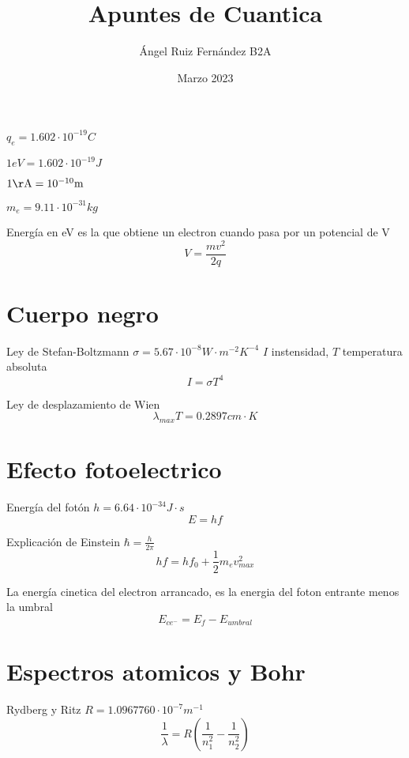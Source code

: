 \documentclass[12pt, letterpaper, twoside]{article}
\title{Apuntes de Cuantica}
\author{Ángel Ruiz Fernández B2A}
\date{Marzo 2023}
\begin{document}
	\maketitle
	
	$q_e = 1.602 \cdot 10^{-19} \si{C}$
	
	$1 \si{eV} = 1.602 \cdot 10^{-19} \si{J}$
	
	$1 \si{\AA} = 10^{-10} \si{m}$
	
	$m_e = 9.11 \cdot 10^{-31} \si{kg}$
	
	Energía en eV es la que obtiene un electron cuando pasa por un potencial de V
	\begin{equation}
		V = \frac{mv^2}{2q}
	\end{equation}
	
	\section{Cuerpo negro}
	
	Ley de Stefan-Boltzmann $\sigma = 5.67 \cdot 10^{-8} \si{W \cdot m^{-2} K^{-4}}$ $I$ instensidad, $T$ temperatura absoluta
	\begin{equation}
		I = \sigma T^4
	\end{equation}
	
	Ley de desplazamiento de Wien	
	\begin{equation}
		\lambda_{max} T = 0.2897 \si{cm \cdot K}	
	\end{equation}

	\section{Efecto fotoelectrico}
	
	Energía del fotón $h = 6.64 \cdot 10^{-34} \si{J \cdot s}$
	\begin{equation}
		E = hf
	\end{equation}

	Explicación de Einstein $\hbar = \frac{h}{2 \pi}$
	\begin{equation}
		hf = hf_0 + \frac{1}{2} m_e v^2_{max}
	\end{equation}

	La energía cinetica del electron arrancado, es la energia del foton entrante menos la umbral
	\begin{equation}
		E_{ce^-} = E_f - E_{umbral}
	\end{equation}

	\section{Espectros atomicos y Bohr}
	Rydberg y Ritz $R = 1.0967760 \cdot 10^{-7} \si{m^{-1}}$
	\begin{equation}
		\frac{1}{\lambda} = R ( \frac{1}{n_{1}^2} - \frac{1}{n^{2}_2})
	\end{equation}
\end{document}
